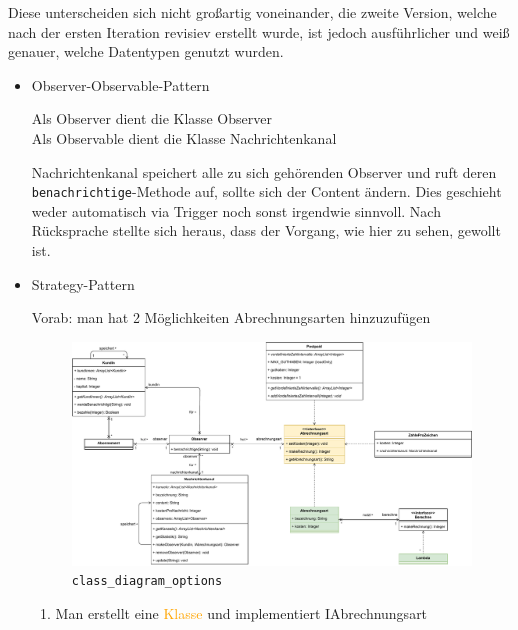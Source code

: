 \documentclass{article}
\newcommand{\gqq}[1]{\glqq{}#1\grqq{}}
\begin{document}
\begin{enumerate}[label=\alph*.]
            Diese unterscheiden sich nicht großartig voneinander, die zweite Version, welche nach der ersten Iteration revisiev erstellt wurde, ist jedoch ausführlicher und weiß genauer, welche Datentypen genutzt wurden.

            \begin{itemize}
                \item Observer-Observable-Pattern
                    
                    Als Observer dient die Klasse \gqq{Observer}\\
                    Als Observable dient die Klasse \gqq{Nachrichtenkanal}

                    Nachrichtenkanal speichert alle zu sich gehörenden Observer und ruft deren \texttt{benachrichtige}-Methode auf, sollte sich der Content ändern.
                    Dies geschieht weder automatisch via Trigger noch sonst irgendwie sinnvoll.
                    Nach Rücksprache stellte sich heraus, dass der Vorgang, wie hier zu sehen, gewollt ist.
                \newpage
                \item Strategy-Pattern
                
                    Vorab: man hat 2 Möglichkeiten Abrechnungsarten hinzuzufügen
                
                    \begin{figure}[ht]
                        \includegraphics[width=\textwidth]{swt_wende_tim_h08_class_diagram_options.pdf}
                        \caption{\texttt{class\_diagram\_options}}
                    \end{figure}
                
                    \begin{enumerate}[label=\arabic*.]
                        \item Man erstellt eine \textcolor{orange}{Klasse} und implementiert \gqq{IAbrechnungsart}


\end{enumerate}
\end{itemize}
\end{enumerate}
\end{document}
